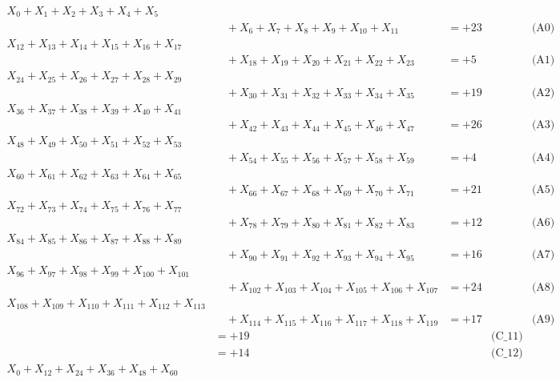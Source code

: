 \documentclass[a4paper,10pt]{article}
\begin{document}
\allowdisplaybreaks
{\small
\begin{align}
X_{0} + X_{1} + X_{2} + X_{3} + X_{4} + X_{5} \\[0.1ex]
&\quad  + X_{6} + X_{7} + X_{8} + X_{9} + X_{10} + X_{11} &= +23 && \text{(A0)} \\
X_{12} + X_{13} + X_{14} + X_{15} + X_{16} + X_{17} \\[0.1ex]
&\quad  + X_{18} + X_{19} + X_{20} + X_{21} + X_{22} + X_{23} &= +5 && \text{(A1)} \\
X_{24} + X_{25} + X_{26} + X_{27} + X_{28} + X_{29} \\[0.1ex]
&\quad  + X_{30} + X_{31} + X_{32} + X_{33} + X_{34} + X_{35} &= +19 && \text{(A2)} \\
X_{36} + X_{37} + X_{38} + X_{39} + X_{40} + X_{41} \\[0.1ex]
&\quad  + X_{42} + X_{43} + X_{44} + X_{45} + X_{46} + X_{47} &= +26 && \text{(A3)} \\
X_{48} + X_{49} + X_{50} + X_{51} + X_{52} + X_{53} \\[0.1ex]
&\quad  + X_{54} + X_{55} + X_{56} + X_{57} + X_{58} + X_{59} &= +4 && \text{(A4)} \\
\allowbreak
X_{60} + X_{61} + X_{62} + X_{63} + X_{64} + X_{65} \\[0.1ex]
&\quad  + X_{66} + X_{67} + X_{68} + X_{69} + X_{70} + X_{71} &= +21 && \text{(A5)} \\
X_{72} + X_{73} + X_{74} + X_{75} + X_{76} + X_{77} \\[0.1ex]
&\quad  + X_{78} + X_{79} + X_{80} + X_{81} + X_{82} + X_{83} &= +12 && \text{(A6)} \\
X_{84} + X_{85} + X_{86} + X_{87} + X_{88} + X_{89} \\[0.1ex]
&\quad  + X_{90} + X_{91} + X_{92} + X_{93} + X_{94} + X_{95} &= +16 && \text{(A7)} \\
X_{96} + X_{97} + X_{98} + X_{99} + X_{100} + X_{101} \\[0.1ex]
&\quad  + X_{102} + X_{103} + X_{104} + X_{105} + X_{106} + X_{107} &= +24 && \text{(A8)} \\
X_{108} + X_{109} + X_{110} + X_{111} + X_{112} + X_{113} \\[0.1ex]
&\quad  + X_{114} + X_{115} + X_{116} + X_{117} + X_{118} + X_{119} &= +17 && \text{(A9)} \\
\allowbreak
 &= +19 && \text{(C\_11)} \\
 &= +14 && \text{(C\_12)} \\
X_{0} + X_{12} + X_{24} + X_{36} + X_{48} + X_{60} \\[0.1ex]

\end{align}}
\end{document}
